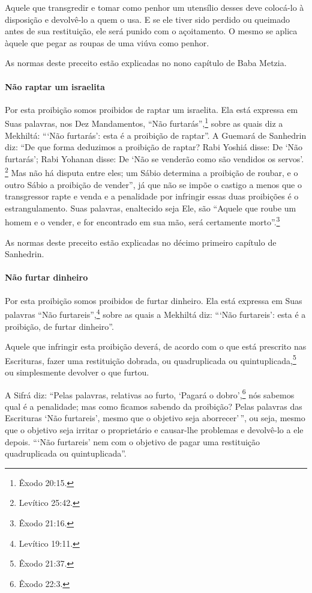 Aquele que transgredir e tomar como penhor um utensílio desses deve
colocá-lo à disposição e devolvê-lo a quem o usa. E se ele tiver sido
perdido ou queimado antes de sua restituição, ele será punido com o
açoitamento. O mesmo se aplica àquele que pegar as roupas de uma viúva
como penhor.

As normas deste preceito estão explicadas no nono capítulo de Baba Metzia.

\paragraph{Não raptar um israelita}

Por esta proibição somos proibidos de raptar um israelita. Ela está
expressa em Suas palavras, nos Dez Mandamentos, ``Não furtarás'',\footnote{Êxodo
20:15.} sobre as quais diz a Mekhiltá: ```Não furtarás': esta é a
proibição de raptar''. A Guemará de Sanhedrin diz: ``De que forma
deduzimos a proibição de raptar? Rabi Yoshiá disse: De `Não furtarás';
Rabi Yohanan disse: De `Não se venderão como são vendidos os servos'. \footnote{Levítico 25:42.} Mas não há disputa entre eles; um Sábio determina a
proibição de roubar, e o outro Sábio a proibição de vender'', já que
não se impõe o castigo a menos que o transgressor rapte e venda
e a penalidade por infringir essas duas proibições é o estrangulamento.
Suas palavras, enaltecido seja Ele, são ``Aquele que roube um homem e
o vender, e for encontrado em sua mão, será certamente morto''.\footnote{Êxodo 21:16.}

As normas deste preceito estão explicadas no décimo primeiro capítulo de Sanhedrin.
  

\paragraph{Não furtar dinheiro}

Por esta proibição somos proibidos de furtar dinheiro. Ela está
expressa em Suas palavras ``Não furtareis'',\footnote{Levítico 19:11.} sobre as
quais a Mekhiltá diz: ```Não furtareis': esta é a proibição, de furtar
dinheiro''.

Aquele que infringir esta proibição deverá, de acordo com o que está
prescrito nas Escrituras, fazer uma restituição dobrada, ou
quadruplicada ou quintuplicada,\footnote{Êxodo 21:37.} ou simplesmente
devolver o que furtou.

A Sifrá diz: ``Pelas palavras, relativas ao furto, `Pagará o dobro',\footnote{Êxodo 22:3.} nós sabemos qual é a penalidade; mas como ficamos sabendo
da proibição? Pelas palavras das Escrituras `Não furtareis', mesmo que
o objetivo seja aborrecer'\,'', ou seja, mesmo que o objetivo seja irritar
o proprietário e causar-lhe problemas e devolvê-lo a ele depois. ```Não
furtareis' nem com o objetivo de pagar uma restituição quadruplicada ou
quintuplicada''.

